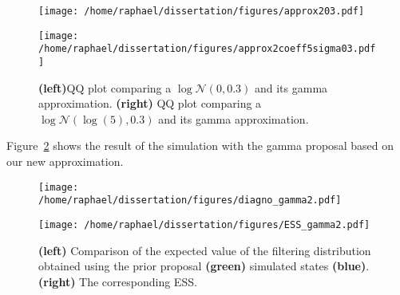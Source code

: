 \documentclass{article}
\begin{document}
\begin{figure}[htb]
	\centering
	\begin{minipage}{.45\textwidth}
		\centering
		\texttt{[image: /home/raphael/dissertation/figures/approx203.pdf]}
	\end{minipage}
	\begin{minipage}{.45\textwidth}
		\centering
		\texttt{[image: /home/raphael/dissertation/figures/approx2coeff5sigma03.pdf]}
	\end{minipage}
	\caption{\textbf{(left)}QQ plot comparing a $\log\mathcal{N}(0, 0.3)$ and its gamma approximation. \textbf{(right)} QQ plot comparing a $\log\mathcal{N}(\log(5), 0.3)$ and its gamma approximation.}
	\label{fig:approx2}
\end{figure}
 \clearpage
Figure~\ref{fig:gamma2} shows the result of the simulation with the gamma proposal based on our new approximation.

\begin{figure}[htb]
	\centering
	\begin{minipage}{.45\textwidth}
		\centering
		\texttt{[image: /home/raphael/dissertation/figures/diagno\_gamma2.pdf]}
	\end{minipage}
	\begin{minipage}{.45\textwidth}
		\centering
		\texttt{[image: /home/raphael/dissertation/figures/ESS\_gamma2.pdf]}
	\end{minipage}
	\caption{\textbf{(left)} Comparison of the expected value of the filtering distribution obtained using the prior proposal \textbf{(green)} simulated states \textbf{(blue)}. \textbf{(right)} The corresponding ESS. }
	\label{fig:gamma2}
\end{figure}
\end{document}

